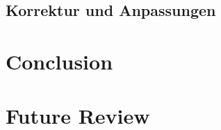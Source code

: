 \documentclass[11pt]{article}
\begin{document}
\subsection{Korrektur und Anpassungen}
\section{Conclusion}
\section{Future Review}
\newpage
\printbibliography%
\end{document}
